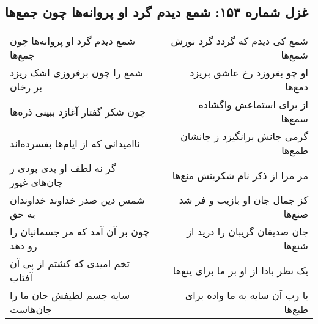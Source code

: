 \begin{center}
\section*{غزل شماره ۱۵۳: شمع دیدم گرد او پروانه‌ها چون جمع‌ها}
\label{sec:0153}
\begin{longtable}{l p{0.5cm} r}
شمع دیدم گرد او پروانه‌ها چون جمع‌ها
&&
شمع کی دیدم که گردد گرد نورش شمع‌ها
\\
شمع را چون برفروزی اشک ریزد بر رخان
&&
او چو بفروزد رخ عاشق بریزد دمع‌ها
\\
چون شکر گفتار آغازد ببینی ذره‌ها
&&
از برای استماعش واگشاده سمع‌ها
\\
ناامیدانی که از ایام‌ها بفسرده‌اند
&&
گرمی جانش برانگیزد ز جانشان طمع‌ها
\\
گر نه لطف او بدی بودی ز جان‌های غیور
&&
مر مرا از ذکر نام شکرینش منع‌ها
\\
شمس دین صدر خداوند خداوندان به حق
&&
کز جمال جان او بازیب و فر شد صنع‌ها
\\
چون بر آن آمد که مر جسمانیان را رو دهد
&&
جان صدیقان گریبان را درید از شنع‌ها
\\
تخم امیدی که کشتم از پی آن آفتاب
&&
یک نظر بادا از او بر ما برای ینع‌ها
\\
سایه جسم لطیفش جان ما را جان‌هاست
&&
یا رب آن سایه به ما واده برای طبع‌ها
\\
\end{longtable}
\end{center}
